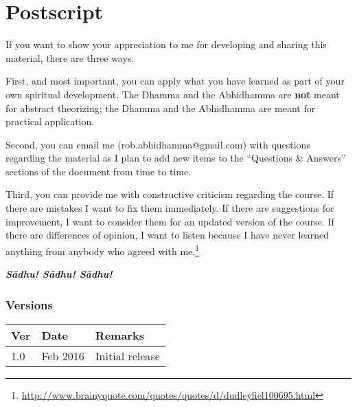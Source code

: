 \section{Postscript}

If you want to show your appreciation to me for developing and sharing this material, there are three ways.

First, and most important, you can apply what you have learned as part of your own spiritual development. The Dhamma and the Abhidhamma are \textbf{not} meant for abstract theorizing; the Dhamma and the Abhidhamma are meant for practical application.

Second, you can email me (rob.abhidhamma@gmail.com) with questions regarding the material as I plan to add new items to the “Questions \& Answers” sections of the document from time to time.

Third, you can provide me with constructive criticism regarding the course. If there are mistakes I want to fix them immediately. If there are suggestions for improvement, I want to consider them for an updated version of the course. If there are differences of opinion, I want to listen because I have never learned anything from anybody who agreed with me.\footnote{\url{http://www.brainyquote.com/quotes/quotes/d/dudleyfiel100695.html}}



\begin{center}
\textbf{\textit{Sādhu! Sādhu! Sādhu!}} \\
\end{center}

\subsubsection*{Versions}
\begin{tabular*}{\textwidth}{lll}
\toprule
\textbf{Ver} & \textbf{Date} & \textbf{Remarks} \\ 
\midrule
1.0 & Feb 2016 & Initial release \\ 
\bottomrule
\end{tabular*} 

